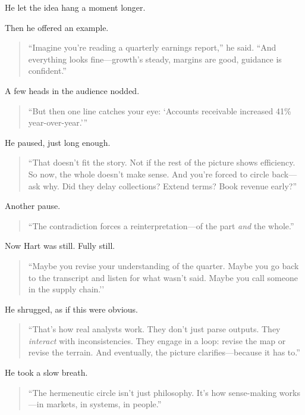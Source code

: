He let the idea hang a moment longer.

Then he offered an example.

\begin{quote}
``Imagine you’re reading a quarterly earnings report,'' he said.  
``And everything looks fine—growth’s steady, margins are good, guidance is confident.''
\end{quote}

A few heads in the audience nodded.

\begin{quote}
``But then one line catches your eye:  
‘Accounts receivable increased 41\% year-over-year.’''
\end{quote}

He paused, just long enough.

\begin{quote}
``That doesn’t fit the story. Not if the rest of the picture shows efficiency.  
So now, the whole doesn’t make sense.  
And you're forced to circle back—ask why.  
Did they delay collections? Extend terms? Book revenue early?''
\end{quote}

Another pause.

\begin{quote}
``The contradiction forces a reinterpretation—of the part \textit{and} the whole.''
\end{quote}

Now Hart was still. Fully still.

\begin{quote}
``Maybe you revise your understanding of the quarter.  
Maybe you go back to the transcript and listen for what wasn’t said.  
Maybe you call someone in the supply chain.’’
\end{quote}

He shrugged, as if this were obvious.

\begin{quote}
``That’s how real analysts work.  
They don’t just parse outputs. They \textit{interact} with inconsistencies.  
They engage in a loop: revise the map or revise the terrain.  
And eventually, the picture clarifies—because it has to.''
\end{quote}

He took a slow breath.

\begin{quote}
``The hermeneutic circle isn’t just philosophy.  
It’s how sense-making works—in markets, in systems, in people.''
\end{quote}

